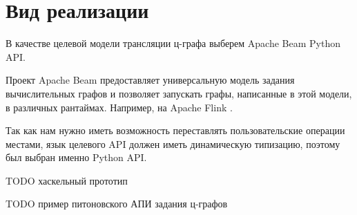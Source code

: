 \section{Вид реализации}

В качестве целевой модели трансляции ц-графа выберем Apache Beam Python API.

Проект Apache Beam предоставляет универсальную модель задания вычислительных графов и позволяет запускать графы, написанные в этой модели, в различных рантаймах. Например, на Apache Flink \cite{beam}.

Так как нам нужно иметь возможность переставлять пользовательские операции местами, язык целевого API должен иметь динамическую типизацию, поэтому был выбран именно Python API.



TODO хаскельный прототип

TODO пример питоновского АПИ задания ц-графов
